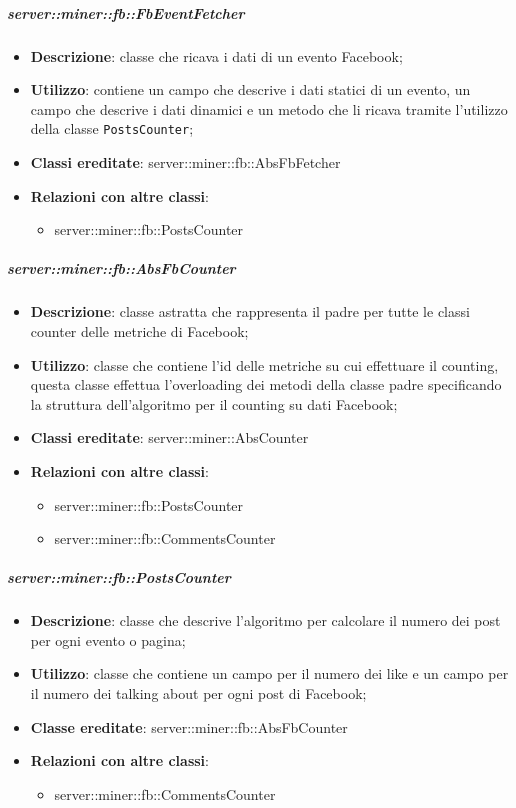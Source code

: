 		\subparagraph{server::miner::fb::FbEventFetcher} %
		\label{subp:server_miner_fb_FbEventFetcher}
			\begin{itemize}
				\item \textbf{Descrizione}: classe che ricava i dati di un evento Facebook;
				\item \textbf{Utilizzo}: contiene un campo che descrive i dati statici di un evento, un campo che descrive i dati dinamici e un metodo che li ricava tramite l'utilizzo della classe \texttt{PostsCounter};
				\item \textbf{Classi ereditate}: server::miner::fb::AbsFbFetcher
				\item \textbf{Relazioni con altre classi}:
					\begin{itemize}
						\item server::miner::fb::PostsCounter
					\end{itemize}
			\end{itemize}

		\subparagraph{server::miner::fb::AbsFbCounter} %
		\label{subp:server_miner_fb_AbsFbCounter}
			\begin{itemize}
				\item \textbf{Descrizione}: classe astratta che rappresenta il padre per tutte le classi counter delle metriche di Facebook;
				\item \textbf{Utilizzo}: classe che contiene l'id delle metriche su cui effettuare il counting, questa classe effettua l'overloading dei metodi della classe padre specificando la struttura dell'algoritmo per il counting su dati Facebook;
				\item \textbf{Classi ereditate}: server::miner::AbsCounter
				\item \textbf{Relazioni con altre classi}:
					\begin{itemize}
						\item server::miner::fb::PostsCounter
						\item server::miner::fb::CommentsCounter
					\end{itemize}
			\end{itemize}

	\subparagraph{server::miner::fb::PostsCounter} %
		\label{subp:server_miner_fb_PostsCounter}
			\begin{itemize}
				\item \textbf{Descrizione}: classe che descrive l'algoritmo per calcolare il numero dei post per ogni evento o pagina;
				\item \textbf{Utilizzo}: classe che contiene un campo per il numero dei like e un campo per il numero dei talking about per ogni post di Facebook;
				\item \textbf{Classe ereditate}: server::miner::fb::AbsFbCounter
				\item \textbf{Relazioni con altre classi}:
					\begin{itemize}
						\item server::miner::fb::CommentsCounter
					\end{itemize}
			\end{itemize}

